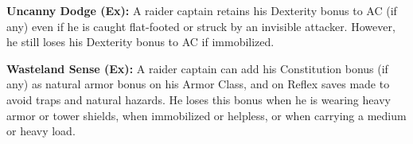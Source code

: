 \textbf{Uncanny Dodge (Ex):} A raider captain retains his Dexterity bonus to AC (if any) even if he is caught flat-footed or struck by an invisible attacker. However, he still loses his Dexterity bonus to AC if immobilized.

\textbf{Wasteland Sense (Ex):} A raider captain can add his Constitution bonus (if any) as natural armor bonus on his Armor Class, and on Reflex saves made to avoid traps and natural hazards. He loses this bonus when he is wearing heavy armor or tower shields, when immobilized or helpless, or when carrying a medium or heavy load.




















